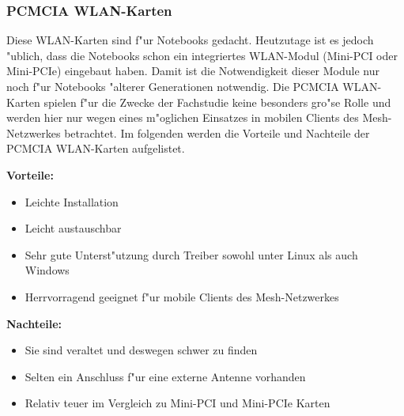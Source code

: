 \newpage
\subsubsection{PCMCIA WLAN-Karten}

Diese WLAN-Karten sind f"ur Notebooks gedacht. Heutzutage ist es jedoch
"ublich, dass die Notebooks schon ein integriertes WLAN-Modul
(Mini-PCI oder Mini-PCIe) eingebaut haben. Damit ist die Notwendigkeit
dieser Module nur noch f"ur Notebooks "alterer Generationen notwendig.
Die PCMCIA WLAN-Karten spielen f"ur die Zwecke der Fachstudie keine
besonders gro"se Rolle und werden hier nur wegen eines m"oglichen
Einsatzes in mobilen Clients des Mesh-Netzwerkes betrachtet.
Im folgenden werden die Vorteile und Nachteile der PCMCIA WLAN-Karten
aufgelistet.

\textbf{Vorteile:}

\begin{itemize}
	\item Leichte Installation
	\item Leicht austauschbar
	\item Sehr gute Unterst"utzung durch Treiber sowohl unter Linux als
	auch Windows
	\item Herrvorragend geeignet f"ur mobile Clients des Mesh-Netzwerkes
\end{itemize}

\textbf{Nachteile:}

\begin{itemize}
	\item Sie sind veraltet und deswegen schwer zu finden
	\item Selten ein Anschluss f"ur eine externe Antenne vorhanden
	\item Relativ teuer im Vergleich zu Mini-PCI und Mini-PCIe Karten
\end{itemize}

